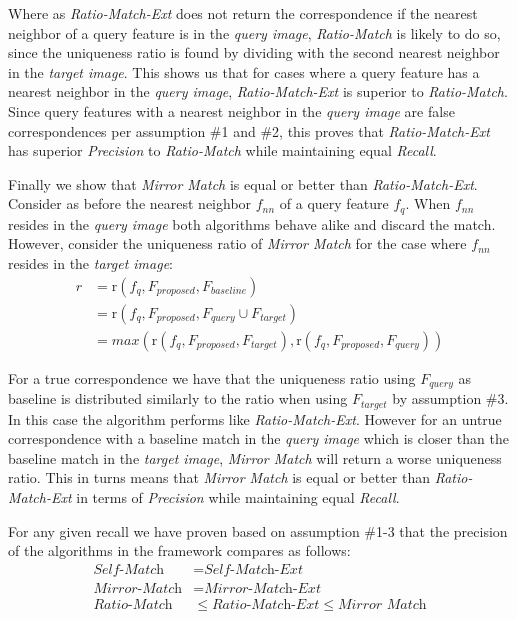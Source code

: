 \documentclass[journal]{IEEEtran}
\begin{document}
Where as \emph{Ratio-Match-Ext} does not return the correspondence if 
the nearest neighbor of a query feature is in the \emph{query image}, 
\emph{Ratio-Match} is likely to do so, since the uniqueness ratio is 
found by dividing with the second nearest neighbor in the \emph{target 
image}. This shows us that for cases where a query feature has a nearest 
neighbor in the \emph{query image}, \emph{Ratio-Match-Ext} is superior 
to \emph{Ratio-Match}. Since query features with a nearest neighbor in 
the \emph{query image} are false correspondences per assumption \#1 and 
\#2, this proves that \emph{Ratio-Match-Ext} has superior 
\emph{Precision} to \emph{Ratio-Match} while maintaining equal 
\emph{Recall}.

Finally we show that \emph{Mirror Match} is equal or better than 
\emph{Ratio-Match-Ext}. Consider as before the nearest neighbor $f_{nn}$ 
of a query feature $f_{q}$. When $f_{nn}$ resides in the \emph{query 
image} both algorithms behave alike and discard the match.  However, 
consider the uniqueness ratio of \emph{Mirror Match} for the case where 
$f_{nn}$ resides in the \emph{target image}:
\begin{align*}
    r &= \text{r}(f_{q}, F_{proposed}, F_{baseline}) \\
        &= \text{r}(f_{q}, F_{proposed}, F_{query} \cup F_{target})\\
        &= max( \text{r}(f_{q}, F_{proposed}, F_{target}), 
    \text{r}(f_{q}, F_{proposed}, F_{query}) )
\end{align*}

For a true correspondence we have that the uniqueness ratio using 
$F_{query}$ as baseline is distributed similarly to the ratio when using 
$F_{target}$ by assumption \#3. In this case the algorithm performs like 
\emph{Ratio-Match-Ext}.  However for an untrue correspondence with a 
baseline match in the \emph{query image} which is closer than the
baseline match in the \emph{target image}, \emph{Mirror Match} will 
return a worse uniqueness ratio. This in turns means that \emph{Mirror 
Match} is equal or better than \emph{Ratio-Match-Ext} in terms of  
\emph{Precision} while maintaining equal \emph{Recall}.

For any given recall we have proven based on assumption \#1-3 that the 
precision of the algorithms in the framework compares as follows:
\begin{align*}
    \textit{Self-Match} &= \textit{Self-Match-Ext} \\
    \textit{Mirror-Match} &= \textit{Mirror-Match-Ext} \\
    \textit{Ratio-Match} &\leq \textit{Ratio-Match-Ext} \leq 
    \textit{Mirror Match}
\end{align*}
\end{document}
